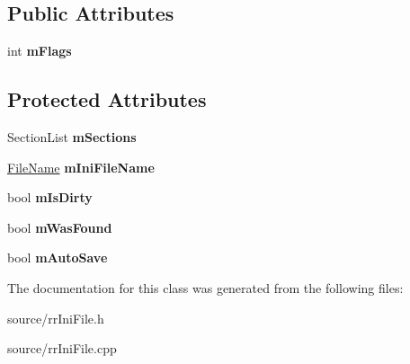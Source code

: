 \subsection*{Public Attributes}
\begin{DoxyCompactItemize}
\item 
\hypertarget{classrr_1_1_ini_file_a1f61bb8810be3b11858c61aa58b65516}{int {\bfseries m\-Flags}}\label{classrr_1_1_ini_file_a1f61bb8810be3b11858c61aa58b65516}

\end{DoxyCompactItemize}
\subsection*{Protected Attributes}
\begin{DoxyCompactItemize}
\item 
\hypertarget{classrr_1_1_ini_file_afe160378b79f83310a173fccbcb591aa}{Section\-List {\bfseries m\-Sections}}\label{classrr_1_1_ini_file_afe160378b79f83310a173fccbcb591aa}

\item 
\hypertarget{classrr_1_1_ini_file_a892cc3520f3558f15b295db69b0f6fa2}{\hyperlink{classrr_1_1_file_name}{File\-Name} {\bfseries m\-Ini\-File\-Name}}\label{classrr_1_1_ini_file_a892cc3520f3558f15b295db69b0f6fa2}

\item 
\hypertarget{classrr_1_1_ini_file_ab86814e8ede20550a978599ddb9f8493}{bool {\bfseries m\-Is\-Dirty}}\label{classrr_1_1_ini_file_ab86814e8ede20550a978599ddb9f8493}

\item 
\hypertarget{classrr_1_1_ini_file_a01fd6810d2c0c4713208975e6e1bb0e9}{bool {\bfseries m\-Was\-Found}}\label{classrr_1_1_ini_file_a01fd6810d2c0c4713208975e6e1bb0e9}

\item 
\hypertarget{classrr_1_1_ini_file_a02f1d8f69fc00103cd3c455020c7a750}{bool {\bfseries m\-Auto\-Save}}\label{classrr_1_1_ini_file_a02f1d8f69fc00103cd3c455020c7a750}

\end{DoxyCompactItemize}


The documentation for this class was generated from the following files\-:\begin{DoxyCompactItemize}
\item 
source/rr\-Ini\-File.\-h\item 
source/rr\-Ini\-File.\-cpp\end{DoxyCompactItemize}
